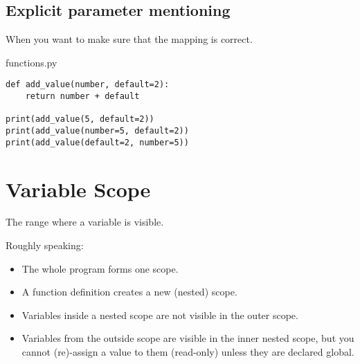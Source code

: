 \documentclass[aspectratio=1610,slidestop]{beamer}
\begin{document}
\subsection{Explicit parameter mentioning}
\begin{pframe}
 When you want to make sure that the mapping is correct.
 \medskip

 \begin{minipage}[t]{0.51\textwidth}
  \begin{pythonfile}{functions.py}
   \begin{verbatim}
def add_value(number, default=2):
    return number + default

print(add_value(5, default=2))
print(add_value(number=5, default=2))
print(add_value(default=2, number=5))
   \end{verbatim}
  \end{pythonfile}
 \end{minipage}\qquad
 \begin{minipage}[t]{0.43\textwidth}
  \vspace{-3.45cm}
  \begin{terminal}
  \end{terminal}
 \end{minipage}
\end{pframe}


\section{Variable Scope}

\begin{pframe}
 The range where a variable is visible.
 \bigskip

 Roughly speaking:
 \begin{itemize}
  \item The whole program forms one scope.
  \item A function definition creates a new (nested) scope.
  \item Variables inside a nested scope are not visible in the outer scope.
  \item Variables from the outside scope are visible in the inner nested scope,
        but you cannot (re)-assign a value to them (read-only) unless they are
       declared global.
 \end{itemize}
\end{pframe}
\end{document}
